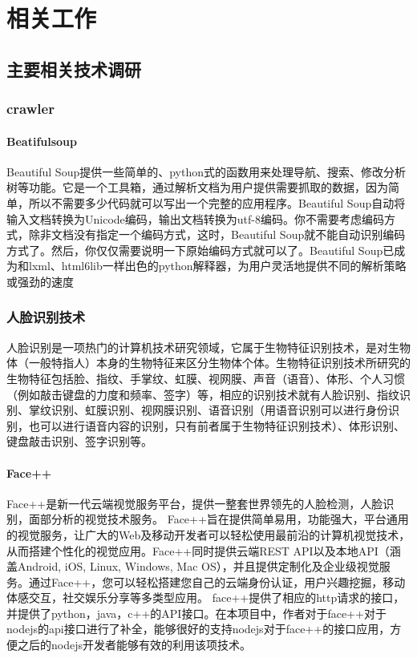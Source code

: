 
\chapter{相关工作}
\section{主要相关技术调研}
\subsection{crawler}
\subsubsection*{Beatifulsoup}
Beautiful Soup提供一些简单的、python式的函数用来处理导航、搜索、修改分析树等功能。它是一个工具箱，通过解析文档为用户提供需要抓取的数据，因为简单，所以不需要多少代码就可以写出一个完整的应用程序。Beautiful Soup自动将输入文档转换为Unicode编码，输出文档转换为utf-8编码。你不需要考虑编码方式，除非文档没有指定一个编码方式，这时，Beautiful Soup就不能自动识别编码方式了。然后，你仅仅需要说明一下原始编码方式就可以了。Beautiful Soup已成为和lxml、html6lib一样出色的python解释器，为用户灵活地提供不同的解析策略或强劲的速度
\subsection{人脸识别技术}
人脸识别是一项热门的计算机技术研究领域，它属于生物特征识别技术，是对生物体（一般特指人）本身的生物特征来区分生物体个体。生物特征识别技术所研究的生物特征包括脸、指纹、手掌纹、虹膜、视网膜、声音（语音）、体形、个人习惯（例如敲击键盘的力度和频率、签字）等，相应的识别技术就有人脸识别、指纹识别、掌纹识别、虹膜识别、视网膜识别、语音识别（用语音识别可以进行身份识别，也可以进行语音内容的识别，只有前者属于生物特征识别技术）、体形识别、键盘敲击识别、签字识别等。
\subsubsection*{Face++}
Face++是新一代云端视觉服务平台，提供一整套世界领先的人脸检测，人脸识别，面部分析的视觉技术服务。
Face++旨在提供简单易用，功能强大，平台通用的视觉服务，让广大的Web及移动开发者可以轻松使用最前沿的计算机视觉技术，从而搭建个性化的视觉应用。Face++同时提供云端REST API以及本地API（涵盖Android, iOS, Linux, Windows, Mac OS），并且提供定制化及企业级视觉服务。通过Face++，您可以轻松搭建您自己的云端身份认证，用户兴趣挖掘，移动体感交互，社交娱乐分享等多类型应用。
face++提供了相应的http请求的接口，并提供了python，java，c++的API接口。在本项目中，作者对于face++对于nodejs的api接口进行了补全，能够很好的支持nodejs对于face++的接口应用，方便之后的nodejs开发者能够有效的利用该项技术。

